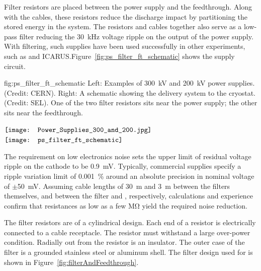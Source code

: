 Filter resistors  are placed between the power supply and the feedthrough.  Along with the cables, these resistors reduce the discharge impact by partitioning the stored energy in the system.  The resistors and cables together also serve as a low-pass filter reducing 
the \SI{30}{kHz} voltage ripple on the output of the power supply.  With filtering, such supplies have been used successfully in other \lartpc experiments, such as \microboone and ICARUS.Figure~\ref{fig:ps_filter_ft_schematic} shows the  supply circuit.

\begin{dunefigure}  
{fig:ps_filter_ft_schematic}
{Left: Examples of \SI{300}{kV} and \SI{200}{kV} power supplies. %
 (Credit: CERN). Right:  A schematic showing the  delivery system to the cryostat. (Credit:  SEL).  
One of the two filter resistors sits near the power supply; the other sits near the feedthrough.}
\begin{minipage}{\textwidth}%
  \centering
 $\vcenter{\hbox{\texttt{[image: Power\_Supplies\_300\_and\_200.jpg]}}}$
 \hspace*{0.001\textwidth}  $\vcenter{\hbox{\texttt{[image: ps\_filter\_ft\_schematic]}}}$
\end{minipage}
\end{dunefigure}
The requirement  
on low electronics noise sets the upper limit of residual voltage ripple on the cathode to be \SI{0.9}{mV}. 
Typically, commercial supplies specify a ripple variation limit of 
\SI{.001}{\%} around an absolute precision in nominal voltage of $\pm$\SI{50}{mV}.
%
Assuming cable lengths of \SI{30}{m} and \SI{3}{m} between the filters themselves, and between the filter and \fdth, respectively, calculations and experience confirm that resistances as low as a few \si{\mega\ohm} yield the required noise reduction. 

The %
filter resistors are of a cylindrical design. 
Each end of a  resistor is electrically connected to a cable receptacle. 
The resistor %
must withstand a large over-power condition.  Radially out from the resistor is an insulator. %
The outer case of the filter is a grounded stainless steel or aluminum shell. The filter design used for  is shown in Figure~\ref{fig:filterAndFeedthrough}.

